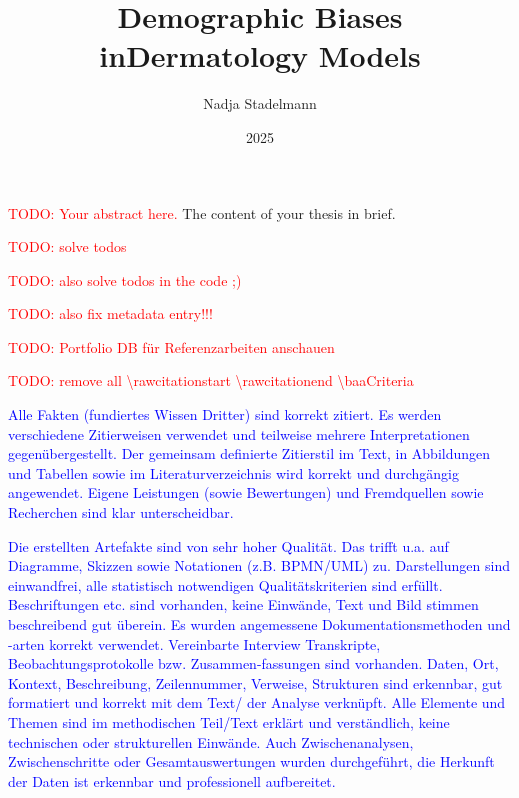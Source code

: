 \documentclass[12pt, a4paper, oneside]{book}   	%
\author{Nadja Stadelmann}                       %
\title{Demographic Biases in\linebreak Dermatology Models}   %
\subtitle{\large \todo{subtitle}}               %
\date{2025}                                     %
\renewcommand{\todo}[1]{\textcolor{red}{TODO: #1}}
\newcommand{\baaCriteria}[1]{\textcolor{blue}{#1}}
\begin{document}
	\english                                        %
	\maketitle
	
	
	\begin{abstractstyle}{\hsummary}
		\todo{Your abstract here.}
	    The content of your thesis in brief.
	\end{abstractstyle}
	
	\tableofcontents
	
	\listoftodos
	\todo{solve todos} 
	
	
	\todo{also solve todos in the code ;)} 
	
	
	\todo{also fix metadata entry!!!} 
	
	
	\todo{Portfolio DB für Referenzarbeiten anschauen}
	
	\todo{remove all \textbackslash rawcitationstart \textbackslash rawcitationend  \textbackslash baaCriteria}
	
	
	\baaCriteria{Alle Fakten (fundiertes Wissen Dritter) sind korrekt zitiert. Es werden verschiedene Zitierweisen verwendet und teilweise mehrere Interpretationen gegenübergestellt. Der gemeinsam definierte Zitierstil im Text, in Abbildungen und Tabellen sowie im Literaturverzeichnis wird korrekt und durchgängig angewendet. Eigene Leistungen (sowie Bewertungen) und Fremdquellen sowie Recherchen sind klar unterscheidbar.} 
	
	
	\baaCriteria{Die erstellten Artefakte sind von sehr hoher Qualität. Das trifft u.a. auf Diagramme, Skizzen sowie Notationen (z.B. BPMN/UML) zu. Darstellungen sind einwandfrei, alle statistisch notwendigen Qualitätskriterien sind erfüllt. Beschriftungen etc. sind vorhanden, keine Einwände, Text und Bild stimmen beschreibend gut überein. Es wurden angemessene Dokumentationsmethoden und -arten korrekt verwendet. Vereinbarte Interview Transkripte, Beobachtungsprotokolle bzw. Zusammen-fassungen sind vorhanden. Daten, Ort, Kontext, Beschreibung, Zeilennummer, Verweise, Strukturen sind erkennbar, gut formatiert und korrekt mit dem Text/ der Analyse verknüpft. Alle Elemente und Themen sind im methodischen Teil/Text erklärt und verständlich, keine technischen oder strukturellen Einwände. Auch Zwischenanalysen, Zwischenschritte oder Gesamtauswertungen wurden durchgeführt, die Herkunft der Daten ist erkennbar und professionell aufbereitet.} 
	
\end{document}
